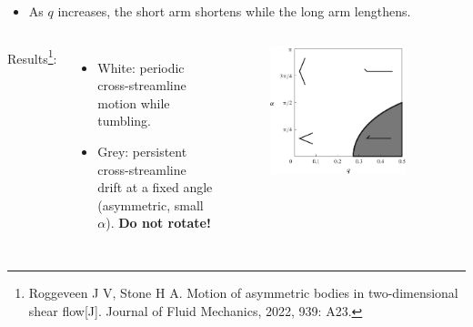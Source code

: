 \documentclass{beamer}
\newcommand{\bi}{\begin{itemize}}
\newcommand{\ei}{\end{itemize}}
\begin{document}
\begin{frame}
\begin{overlayarea}{\textwidth}{\textheight}
\vspace{0.1cm} \small
\bi
\item As $q$ increases, the short arm shortens while the long arm lengthens.
\ei \vspace{-0.15cm}
	\begin{columns}
	Results\footnote{\tiny Roggeveen J V, Stone H A. Motion of asymmetric bodies in two-dimensional shear flow[J]. Journal of Fluid Mechanics, 2022, 939: A23.}:
\bi
\item White: periodic cross-streamline motion while tumbling. \item Grey: persistent cross-streamline drift at a fixed angle (asymmetric, small $\alpha$). \textbf{Do not rotate!}
\ei 
{}
	\begin{figure}[htb]
	\begin{center}
		\includegraphics[width=0.85\textwidth]{plots/stone.png}
	\end{center}
\end{figure}
	\end{columns}
	\end{overlayarea}
\end{frame}

\end{document}
